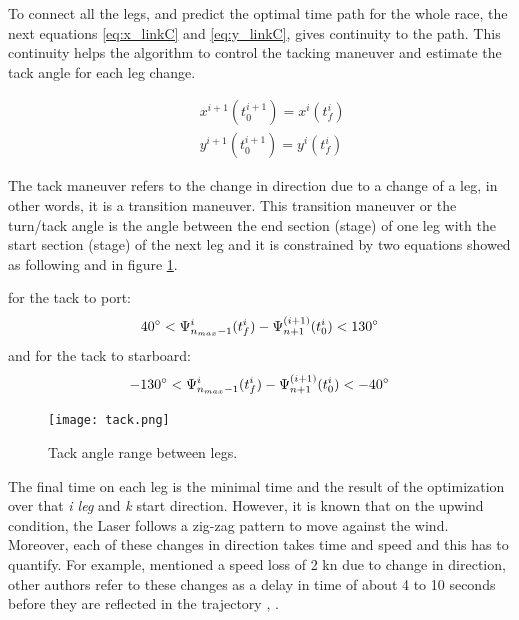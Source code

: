 \par 
To connect all the legs, and predict the optimal time path for the whole race, the next equations \ref{eq:x_linkC} and \ref{eq:y_linkC}, gives continuity to the path. This continuity helps the algorithm to control the tacking maneuver and estimate the tack angle for each leg change.
\par 
\begin{align}
    \quad & x^{i+1}(t_{0}^{i+1})=x^{i}(t_{f}^{i})\label{eq:x_linkC}\\
    \quad & y^{i+1}(t_{0}^{i+1})=y^{i}(t_{f}^{i}) \label{eq:y_linkC}
\end{align}
\par 
The tack maneuver refers to the change in direction due to a change of a leg, in other words, it is a transition maneuver. This transition maneuver or the turn/tack angle is the angle between the end section (stage) of one leg with the start  section (stage) of the next leg and it is constrained by two equations showed as following and in figure \ref{fig:tackAngL}.\par
\noindent
for the tack to port:
\begin{equation}\label{eq:tackportC}
40\degree < \Psi_{n_{max}-1}^{i}(t_{f}^{i}) -
\Psi_{n+1}^{(i+1)}(t_{0}^{i}) < 130 \degree
\end{equation}
\noindent
and for the tack to starboard:
\begin{equation}\label{eq:tackstarbC}
-130\degree < \Psi_{n_{max}-1}^{i}(t_{f}^{i}) -
\Psi_{n+1}^{(i+1)}(t_{0}^{i}) < -40 \degree
\end{equation}
\begin{figure} [hbt!]
    \centering
    \texttt{[image: tack.png]}
    \caption{Tack angle range between legs.}
    \label{fig:tackAngL}
\end{figure}
\par 
The final time on each leg is the minimal time and the result of the optimization over that \textit{i leg} and \textit{k} start direction. However, it is known that on the upwind condition, the Laser follows a zig-zag pattern to move against the wind. Moreover, each of these changes in direction takes time and speed and this has to quantify. For example, \cite{rein2012tra} mentioned a speed loss of 2 kn due to change in direction, other authors refer to these changes as a delay in time of about 4 to 10 seconds before they are reflected in the trajectory \cite{keuning2004mathematical}, \cite{Alves2014ASailboat}.\par \noindent %
